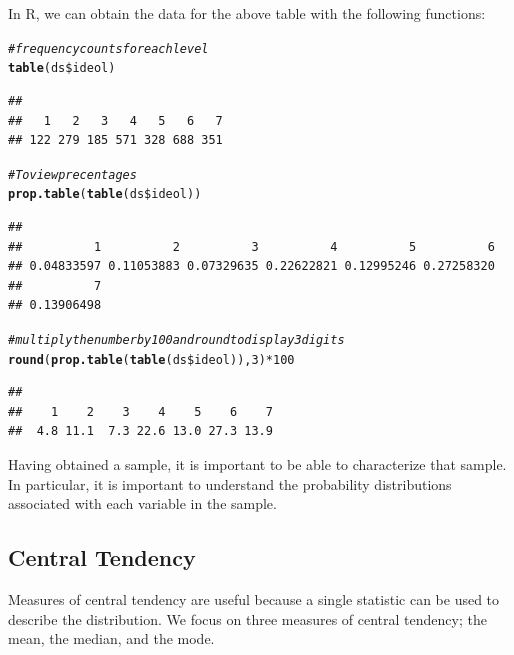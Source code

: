 \documentclass[11pt,openany]{book}\usepackage[]{graphicx}\usepackage[]{color}
\makeatletter
\newcommand{\hlnum}[1]{\textcolor[rgb]{0.686,0.059,0.569}{#1}}%
\newcommand{\hlcom}[1]{\textcolor[rgb]{0.678,0.584,0.686}{\textit{#1}}}%
\newcommand{\hlopt}[1]{\textcolor[rgb]{0,0,0}{#1}}%
\newcommand{\hlstd}[1]{\textcolor[rgb]{0.345,0.345,0.345}{#1}}%
\newcommand{\hlkwd}[1]{\textcolor[rgb]{0.737,0.353,0.396}{\textbf{#1}}}%
\newenvironment{kframe}{%
 \def\at@end@of@kframe{}%
 \ifinner\ifhmode%
  \def\at@end@of@kframe{\end{minipage}}%
  \begin{minipage}{\columnwidth}%
 \fi\fi%
 \def\FrameCommand##1{\hskip\@totalleftmargin \hskip-\fboxsep
 \colorbox{shadecolor}{##1}\hskip-\fboxsep
     \hskip-\linewidth \hskip-\@totalleftmargin \hskip\columnwidth}%
 \MakeFramed {\advance\hsize-\width
   \@totalleftmargin\z@ \linewidth\hsize
   \@setminipage}}%
 {\par\unskip\endMakeFramed%
 \at@end@of@kframe}
\newenvironment{knitrout}{}{} %
\renewenvironment{knitrout}{\begin{singlespace}}{\end{singlespace}}
\makeatother
\begin{document}
\noindent In R, we can obtain the data for the above table with the following functions:

\begin{knitrout}
\color{fgcolor}\begin{kframe}
\begin{alltt}
\hlcom{# frequency counts for each level}
\hlkwd{table}\hlstd{(ds}\hlopt{\$}\hlstd{ideol)}
\end{alltt}
\begin{verbatim}
## 
##   1   2   3   4   5   6   7 
## 122 279 185 571 328 688 351
\end{verbatim}
\begin{alltt}
\hlcom{# To view precentages}
\hlkwd{prop.table}\hlstd{(}\hlkwd{table}\hlstd{(ds}\hlopt{\$}\hlstd{ideol))}
\end{alltt}
\begin{verbatim}
## 
##          1          2          3          4          5          6 
## 0.04833597 0.11053883 0.07329635 0.22622821 0.12995246 0.27258320 
##          7 
## 0.13906498
\end{verbatim}
\begin{alltt}
\hlcom{# multiply the number by 100 and round to display 3 digits}
\hlkwd{round}\hlstd{(}\hlkwd{prop.table}\hlstd{(}\hlkwd{table}\hlstd{(ds}\hlopt{\$}\hlstd{ideol)),} \hlnum{3}\hlstd{)} \hlopt{*} \hlnum{100}
\end{alltt}
\begin{verbatim}
## 
##    1    2    3    4    5    6    7 
##  4.8 11.1  7.3 22.6 13.0 27.3 13.9
\end{verbatim}
\end{kframe}
\end{knitrout}

Having obtained a sample, it is important to be able to characterize that sample.  In particular, it is important to understand the probability distributions associated with each variable in the sample. 

\subsection{Central Tendency} 
Measures of central tendency are useful because a single statistic can  be used to describe the distribution. We focus on three measures of central
tendency; the mean, the median, and the mode.  

\begin{grbox}
\end{grbox}
\end{document}
